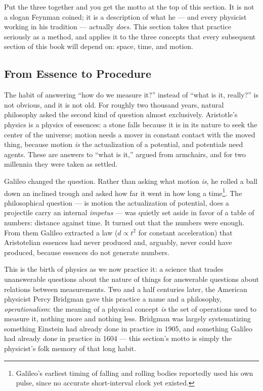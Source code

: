 Put the three together and you get the motto at the top of this section. It is
not a slogan Feynman coined; it is a description of what he --- and every
physicist working in his tradition --- actually \emph{does}. This section takes
that practice seriously as a method, and applies it to the three concepts that
every subsequent section of this book will depend on: space, time, and motion.

\subsection{From Essence to Procedure}

The habit of answering ``how do we measure it?'' instead of ``what is it,
really?'' is not obvious, and it is not old. For roughly two thousand years,
natural philosophy asked the second kind of question almost exclusively.
Aristotle's physics is a physics of essences: a stone falls because it is in
its nature to seek the center of the universe; motion needs a mover in constant
contact with the moved thing, because motion \emph{is} the actualization of a
potential, and potentials need agents. These are answers to ``what is it,''
argued from armchairs, and for two millennia they were taken as settled.

Galileo changed the question. Rather than asking what motion \emph{is}, he
rolled a ball down an inclined trough and asked how far it went in how long a
time\footnote{ Galileo's earliest timing of falling and rolling bodies
reportedly used his own pulse, since no accurate short-interval clock yet
existed.}. The philosophical question --- is motion the actualization of
potential, does a projectile carry an internal \emph{impetus} --- was quietly
set aside in favor of a table of numbers: distance against time. It turned out
that the numbers were enough. From them Galileo extracted a law ($d \propto
t^2$ for constant acceleration) that Aristotelian essences had never produced
and, arguably, never could have produced, because essences do not generate
numbers.

This is the birth of physics as we now practice it: a science that trades
unanswerable questions about the nature of things for answerable questions
about relations between measurements. Two and a half centuries later, the
American physicist Percy Bridgman gave this practice a name and a philosophy,
\emph{operationalism}: the meaning of a physical concept \emph{is} the set of
operations used to measure it, nothing more and nothing less. Bridgman was
largely systematizing something Einstein had already done in practice in 1905,
and something Galileo had already done in practice in 1604 --- this section's
motto is simply the physicist's folk memory of that long habit.

